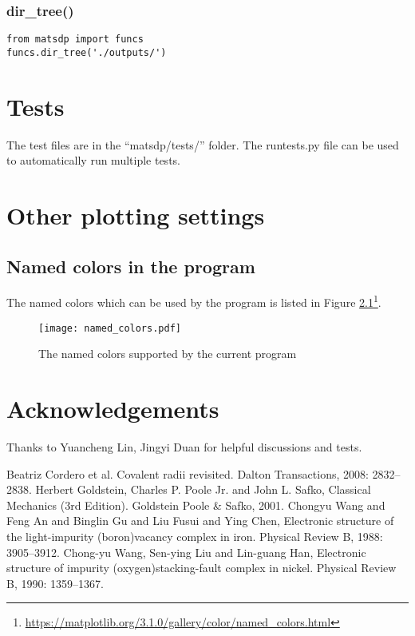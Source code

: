 \documentclass[12pt]{book}
\begin{document}
\subsection{dir\_tree()}

\begin{lstlisting}
from matsdp import funcs
funcs.dir_tree('./outputs/')
\end{lstlisting}

\chapter{Tests}
The test files are in the ``matsdp/tests/'' folder. The runtests.py file can be used to automatically run multiple tests.


\newpage
\appendix

\chapter{Other plotting settings}


\section{\label{sec:supp}Named colors in the program}
The named colors which can be used by the program is listed in Figure \ref{fig:named_colors}\footnote{\url{https://matplotlib.org/3.1.0/gallery/color/named_colors.html}}.
\begin{figure}[htbp]
\centering
\texttt{[image: named\_colors.pdf]}
\caption{The named colors supported by the current program}
\label{fig:named_colors}
\end{figure}



\chapter*{Acknowledgements}
Thanks to Yuancheng Lin, Jingyi Duan for helpful discussions and tests.

\begin{thebibliography}{99}
 Beatriz Cordero et al. Covalent radii revisited. Dalton Transactions, 2008: 2832--2838.
 Herbert Goldstein, Charles P. Poole Jr. and John L. Safko, Classical Mechanics (3rd Edition). Goldstein Poole \& Safko, 2001.
 Chongyu Wang and Feng An and Binglin Gu and Liu Fusui and Ying Chen, Electronic structure of the light-impurity (boron){\textendash}vacancy complex in iron. Physical Review B, 1988: 3905--3912.
 Chong-yu Wang, Sen-ying Liu and Lin-guang Han, Electronic structure of impurity (oxygen){\textendash}stacking-fault complex in nickel. Physical Review B, 1990: 1359--1367.
\end{thebibliography}
\end{document}
